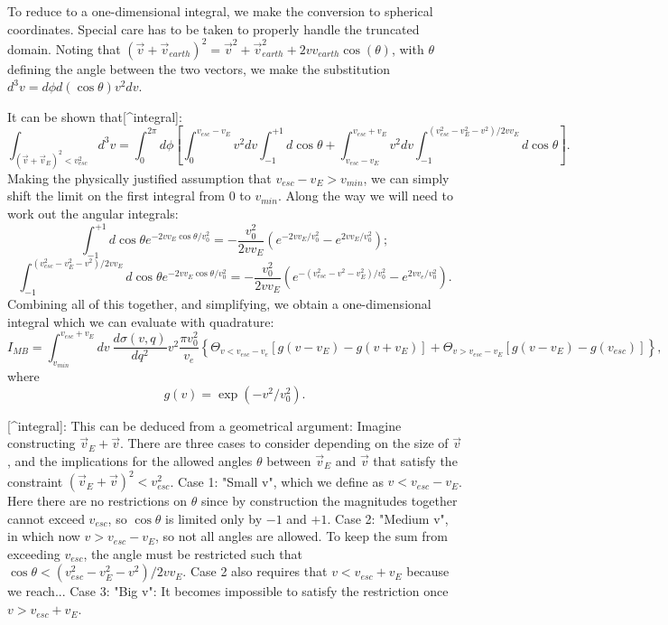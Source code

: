 To reduce to a one-dimensional integral, we make the conversion to spherical
coordinates. Special care has to be taken to properly handle the truncated domain. 
Noting that $(\vec{v}+\vec{v}_{earth})^2 = \vec{v}^2 +
\vec{v}^2_{earth} + 2vv_{earth}\cos(\theta)$, with $\theta$ defining the angle
between the two vectors, we make the substitution $d^3v = d\phi d(\cos \theta)
v^2 dv$. 

It can be shown that[^integral]:
\begin{equation}
    \int_{(\vec{v}+\vec{v}_E)^2<v_{esc}^2} d^3v = \int_0^{2\pi}d\phi \left[
    \int_0^{v_{esc}-v_E}v^2dv\int_{-1}^{+1}d\cos{\theta} 
    + \int_{v_{esc}-v_E}^{v_{esc}+v_E}v^2dv\int_{-1}^{(v_{esc}^2-v_E^2-v^2)/2vv_E}d\cos{\theta}\right].
\end{equation}
Making the physically justified assumption that $v_{esc}-v_E > v_{min}$, we can
simply shift the limit on the first integral from $0$ to $v_{min}$. Along the
way we will need to work out the angular integrals:
\begin{equation}
\int_{-1}^{+1}d\cos{\theta} e^{-2vv_E\cos\theta/v_0^2}=
-\frac{v_0^2}{2vv_E}\left(e^{-2vv_E/v_0^2}-e^{2vv_E/v_0^2}\right);
\end{equation}
\begin{equation}
\int_{-1}^{(v_{esc}^2-v_E^2-v^2)/2vv_E}d\cos\theta e^{-2vv_E\cos\theta/v_0^2}=
-\frac{v_0^2}{2vv_E}\left(e^{-(v_{esc}^2-v^2-v_E^2)/v_0^2}-e^{2vv_e/v_0^2}\right).
\end{equation}
Combining all of this together, and simplifying, we obtain a one-dimensional
integral which we can evaluate with quadrature:
\begin{equation}
I_{MB} = \int_{v_{min}}^{v_{esc}+v_E} dv\ \frac{d\sigma(v,q)}{d{q}^2} v^2 \frac{\pi v_0^2}{v_e} \left\{ \Theta_{v<v_{esc}-v_e}\left[g(v-v_E)-g(v+v_E)\right] + \Theta_{v>v_{esc}-v_E}\left[g(v-v_E)-g(v_{esc})\right]\right\},
\end{equation}
where 
\begin{equation}
g(v) = \exp(-v^2/v_0^2).
\end{equation}


[^integral]: This can be deduced from a geometrical argument: Imagine
    constructing $\vec{v}_E+\vec{v}$. There are three cases to consider depending
    on the size of $\vec{v}$, and the implications for the allowed angles $\theta$
    between $\vec{v}_E$ and $\vec{v}$ that satisfy the constraint 
    $(\vec{v}_E+\vec{v})^2<v_{esc}^2$. Case 1: "Small v", which we define as
    $v<v_{esc}-v_E$. Here there are no restrictions on $\theta$ since by
    construction the magnitudes together cannot exceed $v_{esc}$, so $\cos\theta$
    is limited only by $-1$ and $+1$. Case 2: "Medium v", in which now 
    $v>v_{esc}-v_E$, so not all angles are allowed. To keep the sum from
    exceeding $v_{esc}$, the angle must be restricted such that 
    $\cos\theta<(v_{esc}^2-v_E^2-v^2)/2vv_E$. Case 2 also requires that
    $v<v_{esc}+v_E$ because we reach... Case 3: "Big v": It becomes 
    impossible to satisfy the restriction once $v>v_{esc}+v_E$.

